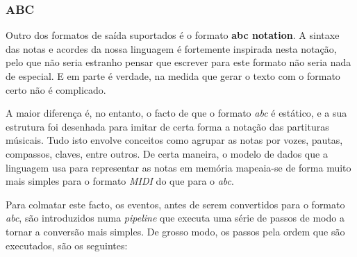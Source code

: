 \subsubsection{ABC}
Outro dos formatos de saída suportados é o formato \textbf{abc notation}. A sintaxe das notas e acordes da nossa linguagem é fortemente inspirada nesta notação, pelo que não seria estranho pensar que escrever para este formato não seria nada de especial. E em parte é verdade, na medida que gerar o texto com o formato certo não é complicado.

A maior diferença é, no entanto, o facto de que o formato \textit{abc} é estático, e a sua estrutura foi desenhada para imitar de certa forma a notação das partituras músicais. Tudo isto envolve conceitos como agrupar as notas por vozes, pautas, compassos, claves, entre outros. De certa maneira, o modelo de dados que a linguagem usa para representar as notas em memória mapeaia-se de forma muito mais simples para o formato \textit{MIDI} do que para o \textit{abc}.

Para colmatar este facto, os eventos, antes de serem convertidos para o formato \textit{abc}, são introduzidos numa \textit{pipeline} que executa uma série de passos de modo a tornar a conversão mais simples. De grosso modo, os passos pela ordem que são executados, são os seguintes:

